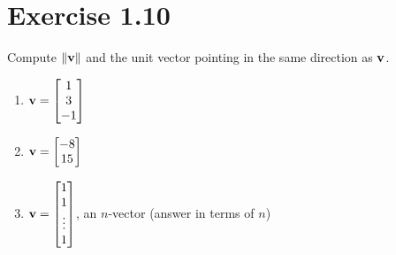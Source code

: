 \section*{Exercise 1.10}
\begin{exercise}
Compute $\left\lVert \mathbf{v} \right\rVert$ and the unit vector pointing in the same direction
as $\mathbf{v}$.
\begin{enumerate}
  \item $\mathbf{v} = \begin{bmatrix} 1 \\ 3 \\ -1 \end{bmatrix}$
  \item $\mathbf{v} = \begin{bmatrix} -8 \\ 15 \end{bmatrix}$
  \item $\mathbf{v} = \begin{bmatrix} 1 \\ 1 \\ \vdots \\ 1 \end{bmatrix}$,
        an $n$-vector (answer in terms of $n$)
\end{enumerate}
\end{exercise}

